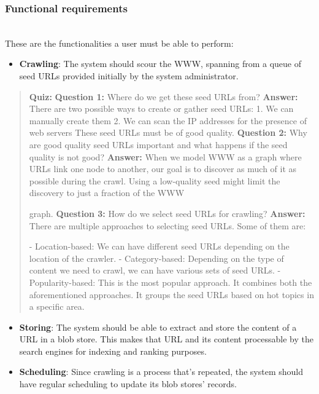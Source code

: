 \subsubsection{Functional requirements}\label{8kx7lYyQiwqvqW9BGINMS}
\\
These are the functionalities a user must be able to perform:

\begin{itemize}
\item
\protect{}\label{iVlcPpoq9Tai0r3cr3CO-}
\textbf{Crawling}: The system should scour the WWW, spanning from a queue of seed URLs provided initially by the system administrator.
\end{itemize}

\begin{quote}
\textbf{Quiz:}
\textbf{Question 1:} Where do we get these seed URLs from?
\textbf{Answer:} There are two possible ways to create or gather seed URLs: 1. We can manually create them 2. We can scan the IP addresses for the presence of web servers These seed URLs must be of good quality.
\textbf{Question 2:} Why are good quality seed URLs important and what happens if the seed quality is not good?
\textbf{Answer:} When we model WWW as a graph where URLs link one node to another, our goal is to discover as much of it as possible during the crawl. Using a low-quality seed might limit the discovery to just a fraction of the WWW

graph.
\textbf{Question 3:} How do we select seed URLs for crawling?
\textbf{Answer:} There are multiple approaches to selecting seed URLs. Some of them are:

- Location-based: We can have different seed URLs depending on the location of the crawler. - Category-based: Depending on the type of content we need to crawl, we can have various sets of seed URLs. - Popularity-based: This is the most popular approach. It combines both the aforementioned approaches. It groups the seed URLs based on hot topics in a specific area.
\end{quote}

\begin{itemize}
\item
\protect{}\label{9LzLExTV2e6hbte7zBnUe}
\textbf{Storing}: The system should be able to extract and store the content of a URL in a blob store. This makes that URL and its content processable by the search engines for indexing and ranking purposes.
\item
\protect{}\label{9rHTsCtEwnRm5X_22TGVl}
\textbf{Scheduling}: Since crawling is a process that's repeated, the system should have regular scheduling to update its blob stores' records.
\end{itemize}

